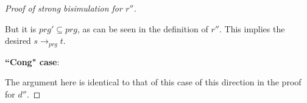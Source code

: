 \documentclass[11pt]{article} %
\begin{document}
\begin{proof}[Proof of strong bisimulation for $r''$]
\begin{enumerate}
But it is $prg' \subseteq prg$, as can be seen in the definition of $r''$. This implies the desired $s \longrightarrow_{prg} t$.
\end{enumerate}

\item \textbf{``Cong" case}:

The argument here is identical to that of this case of this direction in the proof for $d''$.

\end{proof}
\end{document}
